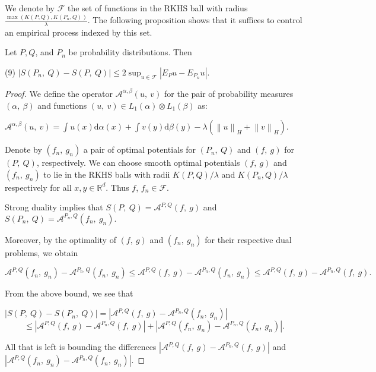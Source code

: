 	We denote by $\mathcal{F}$ the set of functions in the RKHS ball with radius $\frac{\max(K(P,Q),K(P_n,Q))}{\lambda}$. The following proposition shows that it suffices to control an empirical process indexed by this set.
	
	\begin{prop}
		Let $P, Q$, and $P_{n}$ be probability distributions.
		Then
		\begin{center}
			(9)   $|S(P_{n},\displaystyle \ Q)-S(P,\ Q)|\leq 2\sup_{u\in \mathcal{F}}|E_{P}u-E_{P_n}u|.$
		\end{center}
	\end{prop}
	
	\begin{proof}
		
		We define the operator $\mathcal{A}^{\alpha,\beta}(u,\ v)$ for the pair of probability measures $(\alpha,\ \beta)$ and functions $(u,\ v)\in L_{1}(\alpha)\otimes L_{1}(\beta)$ as:
		
		$\displaystyle \mathcal{A}^{\alpha,\beta}(u,\ v)=\int u(x)\mathrm{d}\alpha(x)+\int v(y)\mathrm{d}\beta(y)-\lambda(\left\|u\right\|_H+\left\|v\right\|_H).$
		
		Denote by $(f_{n},\ g_{n})$ a pair of optimal potentials for $(P_{n},\ Q)$ and $(f,\ g)$ for $(P,\ Q)$, respectively. We can choose smooth optimal potentials $(f,\ g)$ and $(f_{n},\ g_{n})$ to lie in the RKHS balls with radii $K(P,Q)/\lambda$ and $K(P_n,Q)/\lambda$ respectively for all $x, y\in \mathbb{R}^{d}.$ Thus $f$, $f_n\in \mathcal{F}$.
		
		Strong duality implies that $S(P,\ Q)=\mathcal{A}^{P,Q}(f,\ g)$ and $S(P_{n},\ Q)=\mathcal{A}^{P_{n},Q}(f_{n},\ g_{n}).$
		
		Moreover, by the optimality of $(f,\ g)$ and $(f_{n},\ g_{n})$ for their respective dual problems, we obtain
		
		$$\mathcal{A}^{P,Q}(f_{n},\ g_{n})-\mathcal{A}^{P_{n},Q}(f_{n},\ g_{n})\leq \mathcal{A}^{P,Q}(f,\ g)-\mathcal{A}^{P_{n},Q}(f_{n},\ g_{n})\leq \mathcal{A}^{P,Q}(f,\ g)-\mathcal{A}^{P_{n},Q}(f,\ g).$$
		
		From the above bound, we see that
		
		$|S(P,\ Q)-S(P_{n},\ Q)|=|\mathcal{A}^{P,Q}(f,\ g)-\mathcal{A}^{P_{n},Q}(f_{n},\ g_{n})|$
		$$
		\leq|\mathcal{A}^{P,Q}(f,\ g)-\mathcal{A}^{P_{n},Q}(f,\ g)|+|\mathcal{A}^{P,Q}(f_{n},\ g_{n})-\mathcal{A}^{P_{n},Q}(f_{n},\ g_{n})|.
		$$
		
		All that is left is bounding the differences $|\mathcal{A}^{P,Q}(f,\ g)-\mathcal{A}^{P_{n},Q}(f,\ g)|$ and $|\mathcal{A}^{P,Q}(f_{n},\ g_{n})- \mathcal{A}^{P_{n},Q}(f_{n},\ g_{n})|.$
		

\end{proof}
